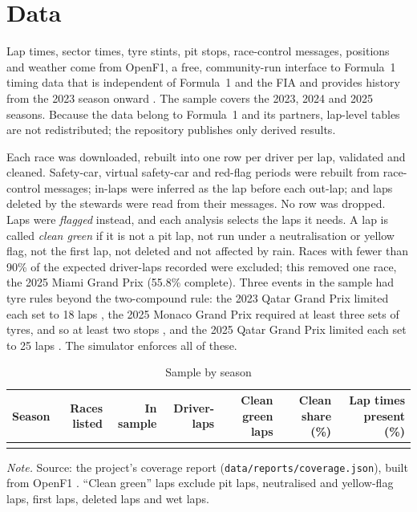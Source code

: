 \documentclass[12pt]{article}
\begin{document}
\section{Data}\label{sec:data}

Lap times, sector times, tyre stints, pit stops, race-control messages, positions and weather come from OpenF1, a free,
community-run interface to Formula~1 timing data that is independent of Formula~1 and the FIA and provides history from
the 2023 season onward \parencite{openf1}. The sample covers the 2023, 2024 and 2025 seasons. Because the data belong to
Formula~1 and its partners, lap-level tables are not redistributed; the repository publishes only derived results.

Each race was downloaded, rebuilt into one row per driver per lap, validated and cleaned. Safety-car, virtual
safety-car and red-flag periods were rebuilt from race-control messages; in-laps were inferred as the lap before each
out-lap; and laps deleted by the stewards were read from their messages. No row was dropped. Laps were \emph{flagged}
instead, and each analysis selects the laps it needs. A lap is called \emph{clean green} if it is not a pit lap, not run
under a neutralisation or yellow flag, not the first lap, not deleted and not affected by rain. Races with fewer than
90\% of the expected driver-laps recorded were excluded; this removed one race, the 2025 Miami Grand Prix (55.8\%
complete). Three events in the sample had tyre rules beyond the two-compound rule: the 2023 Qatar Grand Prix limited each
set to 18 laps \parencite{fia_qatar2023}, the 2025 Monaco Grand Prix required at least three sets of tyres, and so at
least two stops \parencite{f1_monaco_rule}, and the 2025 Qatar Grand Prix limited each set to 25 laps
\parencite{f1_qatar2025}. The simulator enforces all of these.

\begin{table}[htbp]
\centering
\caption{Sample by season}\label{tab:data}
\begin{threeparttable}
\small
\begin{tabularx}{\textwidth}{lRRRRRR}
\toprule
Season & Races listed & In sample & Driver-laps & Clean green laps & Clean share (\%) & Lap times present (\%)\\
\midrule
{}
\bottomrule
\end{tabularx}
\begin{tablenotes}\footnotesize
\item \textit{Note.} Source: the project's coverage report (\texttt{data/reports/coverage.json}), built from OpenF1
\parencite{openf1}. ``Clean green'' laps exclude pit laps, neutralised and yellow-flag laps, first laps, deleted laps
and wet laps.
\end{tablenotes}
\end{threeparttable}
\end{table}
\end{document}
